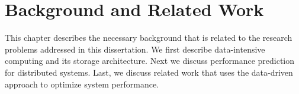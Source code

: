 \chapter{Background and Related Work}
\label{chapter:background}

This chapter describes the necessary background that is related to
the research problems addressed in this dissertation.
We first describe data-intensive computing and its storage architecture.
Next we discuss performance prediction for distributed systems.
Last, we discuss related work that uses the data-driven approach
to optimize system performance.


